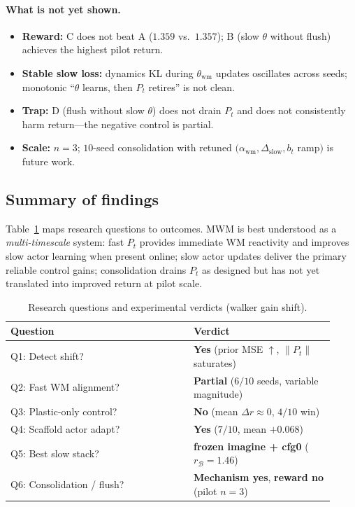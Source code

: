 \paragraph{What is not yet shown.}
\begin{itemize}[leftmargin=*, itemsep=1pt]
  \item \textbf{Reward:} C does not beat A ($1.359$ vs.\ $1.357$); B (slow $\theta$ without flush) achieves the highest pilot return.
  \item \textbf{Stable slow loss:} dynamics KL during $\theta_{\mathrm{wm}}$ updates oscillates across seeds; monotonic ``$\theta$ learns, then $P_t$ retires'' is not clean.
  \item \textbf{Trap:} D (flush without slow $\theta$) does not drain $P_t$ and does not consistently harm return---the negative control is partial.
  \item \textbf{Scale:} $n{=}3$; $10$-seed consolidation with retuned $(\alpha_{\mathrm{wm}}, \Delta_{\mathrm{slow}}, b_t$ ramp$)$ is future work.
\end{itemize}

\subsection{Summary of findings}
\label{sec:exp-summary}

Table~\ref{tab:summary-rq} maps research questions to outcomes.
MWM is best understood as a \emph{multi-timescale} system: fast $P_t$ provides immediate WM reactivity and improves slow actor learning when present online; slow actor updates deliver the primary reliable control gains; consolidation drains $P_t$ as designed but has not yet translated into improved return at pilot scale.

\begin{table}[t]
  \centering
  \caption{Research questions and experimental verdicts (walker gain shift).}
  \label{tab:summary-rq}
  \small
  \begin{tabular}{@{}p{0.52\linewidth}p{0.40\linewidth}@{}}
    \toprule
    Question & Verdict \\
    \midrule
    Q1: Detect shift? & \textbf{Yes} (prior MSE $\uparrow$, $\|P_t\|$ saturates) \\
    Q2: Fast WM alignment? & \textbf{Partial} ($6/10$ seeds, variable magnitude) \\
    Q3: Plastic-only control? & \textbf{No} (mean $\Delta r \approx 0$, $4/10$ win) \\
    Q4: Scaffold actor adapt? & \textbf{Yes} ($7/10$, mean $+0.068$) \\
    Q5: Best slow stack? & \textbf{frozen imagine + cfg0} ($r_{\mathcal{B}}{=}1.46$) \\
    Q6: Consolidation / flush? & \textbf{Mechanism yes}, \textbf{reward no} (pilot $n{=}3$) \\
    \bottomrule
  \end{tabular}
\end{table}

